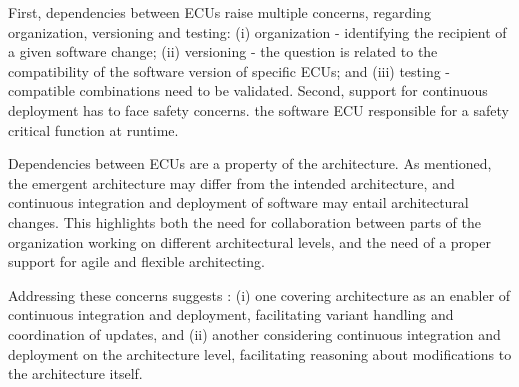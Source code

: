 First,  dependencies between ECUs raise multiple concerns,
regarding organization, versioning and testing:
(i)  organization -
identifying the recipient
of a given software change; (ii)
 versioning -
the question is related to the compatibility of the software version of specific ECUs; and
(iii)  testing -  %
compatible combinations need to be validated. 
Second, support for continuous deployment has to face safety concerns.
 the software  ECU responsible for a safety critical function at runtime.

Dependencies between ECUs are a property of the architecture.
As mentioned, the emergent architecture may differ from the intended architecture,
and continuous integration and deployment of software may entail architectural changes.
This highlights both the need for collaboration %
between parts of the organization working on different architectural levels, and the need of a proper support
for agile and flexible architecting.

Addressing these concerns suggests :
(i) one covering architecture as an enabler
of continuous integration and deployment,
facilitating variant handling and coordination of updates, and
%
(ii) another considering continuous integration and deployment
on the architecture level,
facilitating reasoning about modifications to the architecture itself.


